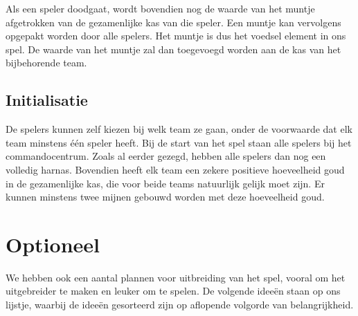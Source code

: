 Als een speler doodgaat, wordt bovendien nog de waarde van het muntje afgetrokken van de gezamenlijke kas van die speler. Een muntje kan vervolgens opgepakt worden door alle spelers. Het muntje is dus het voedsel element in ons spel. De waarde van het muntje zal dan toegevoegd worden aan de kas van het bijbehorende team.

\subsection{Initialisatie}
De spelers kunnen zelf kiezen bij welk team ze gaan, onder de voorwaarde dat elk team minstens \'e\'en speler heeft. Bij de start van het spel staan alle spelers bij het commandocentrum. Zoals al eerder gezegd, hebben alle spelers dan nog een volledig harnas. Bovendien heeft elk team een zekere positieve hoeveelheid goud in de gezamenlijke kas, die voor beide teams natuurlijk gelijk moet zijn. Er kunnen minstens twee mijnen gebouwd worden met deze hoeveelheid goud.

\section{Optioneel}
We hebben ook een aantal plannen voor uitbreiding van het spel, vooral om het uitgebreider te maken en leuker om te spelen. De volgende idee\"en staan op ons lijstje, waarbij de idee\"en gesorteerd zijn op aflopende volgorde van belangrijkheid.

